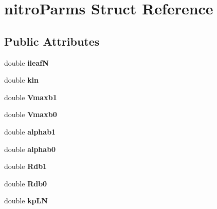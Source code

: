 \hypertarget{structnitro_parms}{\section{nitro\-Parms Struct Reference}
\label{structnitro_parms}
}
\subsection*{Public Attributes}
\begin{DoxyCompactItemize}
\item 
\hypertarget{structnitro_parms_a61815648aafb8e92c5367b85752cd6e8}{double {\bfseries ileaf\-N}}\label{structnitro_parms_a61815648aafb8e92c5367b85752cd6e8}

\item 
\hypertarget{structnitro_parms_ac14a7d8c394d85c18e53ac222a1818e3}{double {\bfseries kln}}\label{structnitro_parms_ac14a7d8c394d85c18e53ac222a1818e3}

\item 
\hypertarget{structnitro_parms_a1c7f001a6620cba218a735e94dacafc5}{double {\bfseries Vmaxb1}}\label{structnitro_parms_a1c7f001a6620cba218a735e94dacafc5}

\item 
\hypertarget{structnitro_parms_af39da18e7964fdbe77fde342dcf97a5b}{double {\bfseries Vmaxb0}}\label{structnitro_parms_af39da18e7964fdbe77fde342dcf97a5b}

\item 
\hypertarget{structnitro_parms_ab996844d0d28b9ed8324652ef03c7a9f}{double {\bfseries alphab1}}\label{structnitro_parms_ab996844d0d28b9ed8324652ef03c7a9f}

\item 
\hypertarget{structnitro_parms_a6ec6c8e941790e6cffb91bcc9916df67}{double {\bfseries alphab0}}\label{structnitro_parms_a6ec6c8e941790e6cffb91bcc9916df67}

\item 
\hypertarget{structnitro_parms_aafdfebf8e92977c0185a1e4a3155b439}{double {\bfseries Rdb1}}\label{structnitro_parms_aafdfebf8e92977c0185a1e4a3155b439}

\item 
\hypertarget{structnitro_parms_ab87cf4969607b3d3afd0bd895b219543}{double {\bfseries Rdb0}}\label{structnitro_parms_ab87cf4969607b3d3afd0bd895b219543}

\item 
\hypertarget{structnitro_parms_aa5f95ca2b38c8309f084b7e486767a83}{double {\bfseries kp\-L\-N}}\label{structnitro_parms_aa5f95ca2b38c8309f084b7e486767a83}


\end{DoxyCompactItemize}
